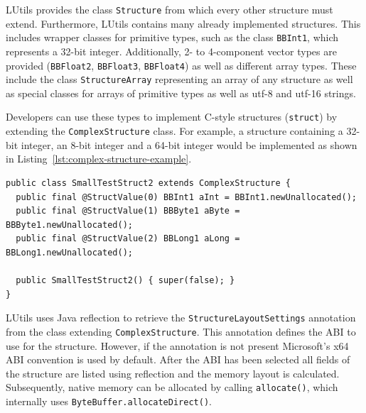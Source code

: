 LUtils provides the class \texttt{Structure} from which every other structure must extend.
Furthermore, LUtils contains many already implemented structures.
This includes wrapper classes for primitive types, such as the class \texttt{BBInt1}, which represents a 32-bit integer.
Additionally, 2- to 4-component vector types are provided (\texttt{BBFloat2}, \texttt{BBFloat3}, \texttt{BBFloat4}) as well as different
array types.
These include the class \texttt{StructureArray} representing an array of any structure as well as special classes for
arrays of primitive types as well as utf-8 and utf-16 strings.

Developers can use these types to implement C-style structures (\texttt{struct}) by extending the \texttt{ComplexStructure} class.
For example, a structure containing a 32-bit integer, an 8-bit integer and a 64-bit integer would be implemented as shown
in Listing~\ref{lst:complex-structure-example}.
\begin{lstlisting}[caption={Example structure implemented in LUtils}, label={lst:complex-structure-example}]
public class SmallTestStruct2 extends ComplexStructure {
  public final @StructValue(0) BBInt1 aInt = BBInt1.newUnallocated();
  public final @StructValue(1) BBByte1 aByte = BBByte1.newUnallocated();
  public final @StructValue(2) BBLong1 aLong = BBLong1.newUnallocated();

  public SmallTestStruct2() { super(false); }
}
\end{lstlisting}

LUtils uses Java reflection to retrieve the \texttt{StructureLayoutSettings} annotation from the class extending
\texttt{ComplexStructure}.
This annotation defines the ABI to use for the structure.
However, if the annotation is not present Microsoft's x64 ABI convention is used by default.
After the ABI has been selected all fields of the structure are listed using reflection and the memory layout is calculated.
Subsequently, native memory can be allocated by calling \texttt{allocate()}, which internally uses \texttt{ByteBuffer.allocateDirect()}.
